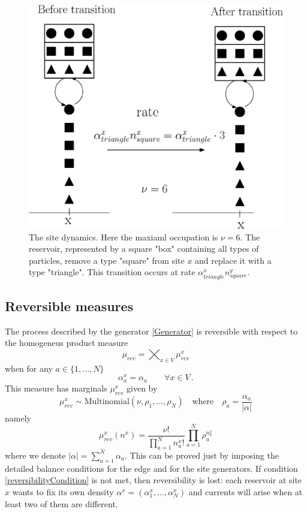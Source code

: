 \documentclass[11pt]{article}
\numberwithin{equation}{section}
\numberwithin{equation}{subsection}
\newcommand{\twoj}{\nu}
\begin{document}
\begin{figure}
    \centering
    \includegraphics[scale=0.4]{BoundaryStirring.eps}
    \caption{The site dynamics. Here the maxiaml occupation is $\nu=6$. The reservoir, represented by a square "box" containing all types of particles, remove a type "square" from site $x$ and replace it with a type "triangle". This transition occurs at rate $\alpha_{triangle}^{x}n_{square}^{y}$.}
    \label{fig:2}
\end{figure}
\subsection{Reversible measures}
The process described by the generator \eqref{Generator} is reversible with respect to the homogeneus product measure \begin{equation}\label{reversibleMeasure}
\mu_{rev}=\bigtimes_{x\in V}\mu_{rev}^{x}
\end{equation}
when for any $a\in\{1,\ldots,N\}$
\begin{equation}\label{reversibilityCondition}
\alpha_{a}^{x}=\alpha_{a}\qquad \forall x\in V\,.
\end{equation}
This measure has marginals $\mu_{rev}^{x}$ given by 
\begin{equation}
 \mu^{x}_{rev}\sim \text{Multinomial}\left(\twoj,\rho_{1},\ldots,\rho_{N}\right)\quad \text{where}\quad \rho_{a}=\frac{\alpha_{a}}{|\alpha|}
\end{equation}
namely
\begin{equation}
\mu_{rev}^{x}(n^{x})=\frac{\nu!}{\prod_{a=1}^{N}n_{a}^{x}!}\prod_{a=1}^{N}\rho_{a}^{n_{a}^{x}}
\end{equation}
where we denote $|\alpha|=\sum_{a=1}^{N}\alpha_{a}$. 
This can be proved just by imposing the detailed balance conditions for the edge and for the site generators. If condition \eqref{reversibilityCondition} is not met, then reversibility is lost: each reservoir at site $x$ wants to fix its own density $\alpha^{x}=(\alpha_{1}^{x},\ldots,\alpha_{N}^{x})$ and currents will arise when at least two of them are different. 
\end{document}
